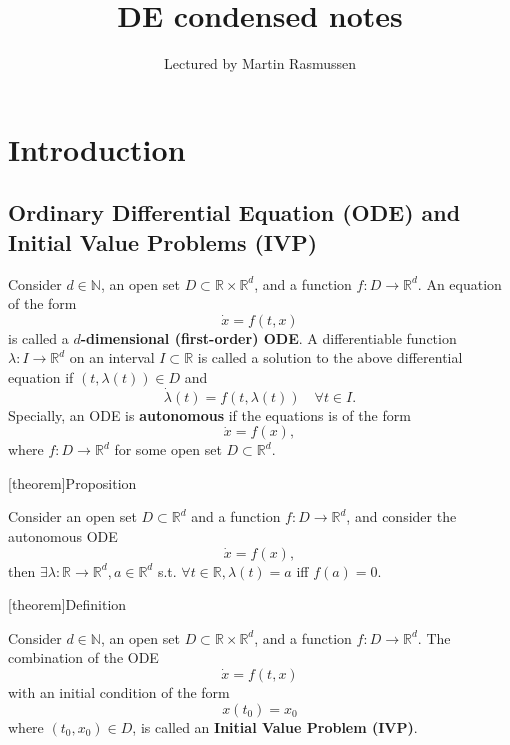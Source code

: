 \documentclass[12pt]{report}
\author{Lectured by Martin Rasmussen}
\title{DE condensed notes}
\affil{Typed by Aris Zhu Yi Qing}
\theoremstyle{definition}
\begin{document}
\maketitle
\tableofcontents

\chapter{Introduction}

\section{Ordinary Differential Equation (ODE) and Initial Value Problems (IVP)}

\begin{theorem}
    Consider $d\in\mathbb{N}$, an open set $D \subset
    \mathbb{R}\times\mathbb{R}^{d}$, and a function
    $f:D\rightarrow\mathbb{R}^{d}$. An equation of the form
    \[
        \dot{x} = f(t,x)
    \]
    is called a \textbf{$d$-dimensional (first-order) ODE}.
    A differentiable function $\lambda:I\rightarrow\mathbb{R}^{d}$
    on an interval $I\subset \mathbb{R}$ is called a solution to the
    above differential equation if $(t,\lambda(t))\in D$ and\[
        \dot{\lambda}(t)=f(t,\lambda(t)) \quad \forall t\in I.
    \]
    Specially, an ODE is \textbf{autonomous} if the equations is of the form
    \[
        \dot{x} = f(x),
    \]
    where $f:D\rightarrow\mathbb{R}^{d}$ for some open set
    $D\subset\mathbb{R}^{d}$.
\end{theorem}

[theorem]{Proposition}
\begin{constant solutions to autonomous ODE}\label{constant solutions to autonomous ODE}
    Consider an open set $D\subset\mathbb{R}^{d}$ and a function
    $f:D\rightarrow\mathbb{R}^{d}$, and consider the autonomous ODE
    \[
        \dot{x} = f(x),
    \]
    then $\exists \lambda:\mathbb{R}\rightarrow\mathbb{R}^{d}, a\in\mathbb{R}^{d}$
    s.t. $\forall t\in\mathbb{R},\lambda(t)=a$ iff $f(a)=0$.
\end{constant solutions to autonomous ODE}

[theorem]{Definition}
\begin{IVP}
    Consider $d\in\mathbb{N}$,
    an open set $D\subset \mathbb{R}\times\mathbb{R}^{d}$,
    and a function $f:D\rightarrow\mathbb{R}^{d}$.
    The combination of the ODE\[
        \dot{x}=f(t,x)
    \]with an initial condition of the form\[
        x(t_0)=x_0
    \]
    where $(t_0,x_0)\in D$, is called an \textbf{Initial Value Problem (IVP)}.
\end{IVP}
\end{document}
